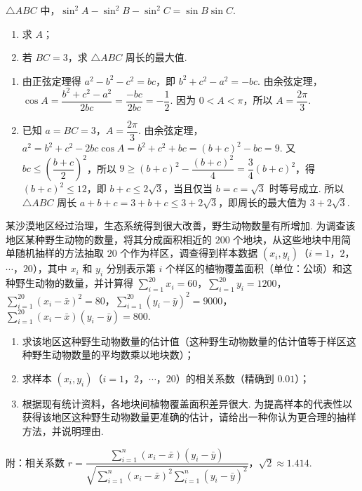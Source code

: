 \begin{problem}
\(\triangle ABC\) 中，\(\sin^2 A-\sin^2 B-\sin^2 C=\sin B\sin C\).

\begin{enumerate}
\item 求 \(A\)；
\item 若 \(BC=3\)，求 \(\triangle ABC\) 周长的最大值.
\end{enumerate}
\end{problem}

\begin{solution}
\begin{enumerate}
\item 由正弦定理得 \(a^2-b^2-c^2=bc\)，即 \(b^2+c^2-a^2=-bc\). 由余弦定理，\(\cos A=\dfrac{b^2+c^2-a^2}{2bc}=\dfrac{-bc}{2bc}=-\dfrac12\). 因为 \(0<A<\pi\)，所以 \(A=\dfrac{2\pi}{3}\).
\item 已知 \(a=BC=3\)，\(A=\dfrac{2\pi}{3}\). 由余弦定理，\(a^2=b^2+c^2-2bc\cos A=b^2+c^2+bc=(b+c)^2-bc=9\). 又 \(bc\le\left(\dfrac{b+c}{2}\right)^2\)，所以 \(9\ge(b+c)^2-\dfrac{(b+c)^2}{4}=\dfrac34(b+c)^2\)，得 \((b+c)^2\le12\)，即 \(b+c\le2\sqrt3\)，当且仅当 \(b=c=\sqrt3\) 时等号成立. 所以 \(\triangle ABC\) 周长 \(a+b+c=3+b+c\le3+2\sqrt3\)，即周长的最大值为 \(3+2\sqrt3\).
\end{enumerate}
\end{solution}

\begin{problem}
某沙漠地区经过治理，生态系统得到很大改善，野生动物数量有所增加. 为调查该地区某种野生动物的数量，将其分成面积相近的 \(200\) 个地块，从这些地块中用简单随机抽样的方法抽取 \(20\) 个作为样区，调查得到样本数据 \((x_i,y_i)\)（\(i=1\)，\(2\)，\(\cdots\)，\(20\)），其中 \(x_i\) 和 \(y_i\) 分别表示第 \(i\) 个样区的植物覆盖面积（单位：公顷）和这种野生动物的数量，并计算得 \(\sum_{i=1}^{20}x_i=60\)，\(\sum_{i=1}^{20}y_i=1200\)，\(\sum_{i=1}^{20}\left( x_i-\bar{x} \right)^2=80\)，\(\sum_{i=1}^{20}\left( y_i-\bar{y} \right)^2=9000\)，\(\sum_{i=1}^{20}\left( x_i-\bar{x} \right)\left( y_i-\bar{y} \right)=800\).

\begin{enumerate}
\item 求该地区这种野生动物数量的估计值（这种野生动物数量的估计值等于样区这种野生动物数量的平均数乘以地块数）；
\item 求样本 \((x_i,y_i)\)（\(i=1\)，\(2\)，\(\cdots\)，\(20\)）的相关系数（精确到 \(0.01\)）；
\item 根据现有统计资料，各地块间植物覆盖面积差异很大. 为提高样本的代表性以获得该地区这种野生动物数量更准确的估计，请给出一种你认为更合理的抽样方法，并说明理由.
\end{enumerate}

附：相关系数 \(r=\dfrac{\sum_{i=1}^{n}\left( x_i-\bar{x} \right)\left( y_i-\bar{y} \right)}{\sqrt{\sum_{i=1}^{n}\left( x_i-\bar{x} \right)^2\sum_{i=1}^{n}\left( y_i-\bar{y} \right)^2}}\)，\(\sqrt2\approx 1.414\).
\end{problem}

